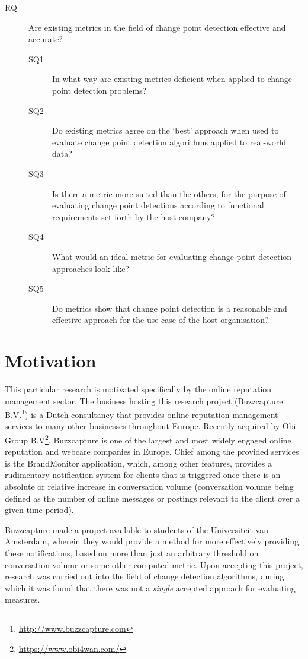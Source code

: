 \documentclass[../main.tex]{subfiles}
\begin{document}
\begin{description}
    \item[RQ] Are existing metrics in the field of change point detection effective and accurate?
    \begin{description}
    \item[SQ1] In what way are existing metrics deficient when applied to change point detection problems?
    \item[SQ2] Do existing metrics agree on the `best' approach when used to evaluate change point detection algorithms applied to real-world data?
    \item[SQ3] Is there a metric more suited than the others, for the purpose of evaluating change point detections according to functional requirements set forth by the host company?
    \item[SQ4] What would an ideal metric for evaluating change point detection approaches look like?
    \item[SQ5] Do metrics show that change point detection is a reasonable and effective approach for the use-case of the host organisation?
\end{description}
\end{description}

\section{Motivation}

This particular research is motivated specifically by the online reputation management sector. The business hosting this research project (Buzzcapture B.V.\footnote{\url{http://www.buzzcapture.com}}) is a Dutch consultancy that provides online reputation management services to many other businesses throughout Europe. Recently acquired by Obi Group B.V\footnote{\url{https://www.obi4wan.com/}}, Buzzcapture is one of the largest and most widely engaged online reputation and webcare companies in Europe. Chief among the provided services is the BrandMonitor application, which, among other features, provides a rudimentary notification system for clients that is triggered once there is an absolute or relative increase in conversation volume (conversation volume being defined as the number of online messages or postings relevant to the client over a given time period).

Buzzcapture made a project available to students of the Universiteit van Amsterdam, wherein they would provide a method for more effectively providing these notifications, based on more than just an arbitrary threshold on conversation volume or some other computed metric. Upon accepting this project, research was carried out into the field of change detection algorithms, during which it was found that there was not a \emph{single} accepted approach for evaluating measures.
\end{document}
